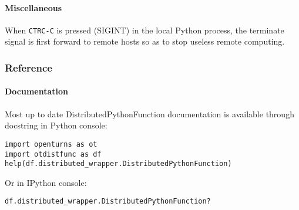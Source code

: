 \paragraph{Miscellaneous} When \verb|CTRC-C| is pressed (SIGINT) in the local Python process, the terminate signal is first forward to remote hosts so as to stop useless remote computing.

\subsubsection{Reference}

\paragraph{Documentation}
Most up to date DistributedPythonFunction documentation is available through docstring in Python console:

\begin{lstlisting}
import openturns as ot
import otdistfunc as df
help(df.distributed_wrapper.DistributedPythonFunction)
\end{lstlisting}

Or in IPython console:
\begin{lstlisting}
df.distributed_wrapper.DistributedPythonFunction?
\end{lstlisting}

